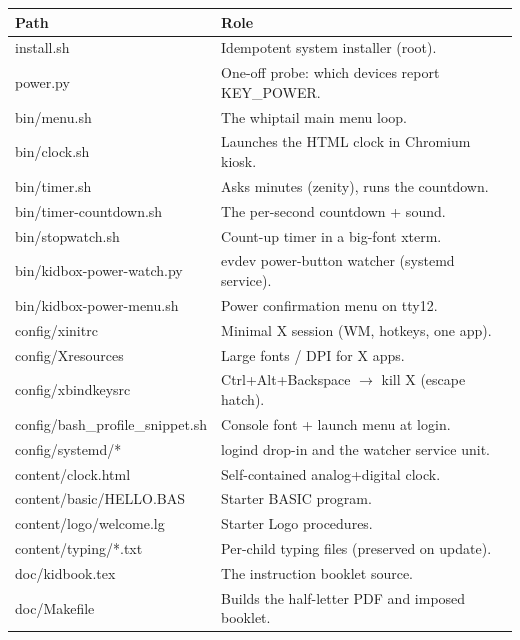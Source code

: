 \documentclass[11pt,oneside]{article}
\begin{document}
\begin{table}[ht]
\small
\begin{tabular}{@{}>{\ttfamily}p{}p{}@{}}
\toprule
\rmfamily\textbf{Path} & \textbf{Role}\\
\midrule
install.sh                  & Idempotent system installer (root).\\
power.py                    & One-off probe: which devices report KEY\_POWER.\\
bin/menu.sh                 & The whiptail main menu loop.\\
bin/clock.sh                & Launches the HTML clock in Chromium kiosk.\\
bin/timer.sh                & Asks minutes (zenity), runs the countdown.\\
bin/timer-countdown.sh      & The per-second countdown + sound.\\
bin/stopwatch.sh            & Count-up timer in a big-font xterm.\\
bin/kidbox-power-watch.py   & evdev power-button watcher (systemd service).\\
bin/kidbox-power-menu.sh    & Power confirmation menu on tty12.\\
config/xinitrc              & Minimal X session (WM, hotkeys, one app).\\
config/Xresources           & Large fonts / DPI for X apps.\\
config/xbindkeysrc          & Ctrl+Alt+Backspace $\to$ kill X (escape hatch).\\
config/bash\_profile\_snippet.sh & Console font + launch menu at login.\\
config/systemd/*            & logind drop-in and the watcher service unit.\\
content/clock.html          & Self-contained analog+digital clock.\\
content/basic/HELLO.BAS     & Starter BASIC program.\\
content/logo/welcome.lg     & Starter Logo procedures.\\
content/typing/*.txt        & Per-child typing files (preserved on update).\\
doc/kidbook.tex             & The instruction booklet source.\\
doc/Makefile                & Builds the half-letter PDF and imposed booklet.\\
\bottomrule
\end{tabular}
\end{table}
\end{document}
